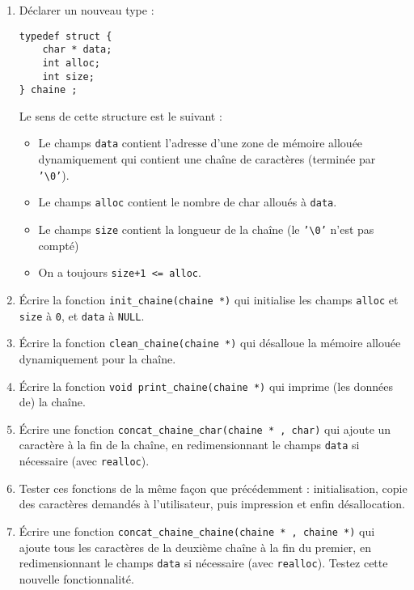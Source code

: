 \documentclass[final, pdftex, a4paper, openbib, ]{article}
\begin{document}
\begin{enumerate}
	\item Déclarer un nouveau type :
			\begin{verbatim}
typedef struct {
	char * data;
	int alloc;
	int size;
} chaine ;
			\end{verbatim}	

	Le sens de cette structure est le suivant :
	
	\begin{itemize}
		\item Le champs \texttt{data} contient l'adresse d'une zone de mémoire allouée dynamiquement qui
contient une chaîne de caractères (terminée par \texttt{'\textbackslash{}0'}).
		\item Le champs \texttt{alloc} contient le nombre de char alloués à \texttt{data}.
		\item Le champs \texttt{size} contient la longueur de la chaîne (le \texttt{'\textbackslash{}0'} n'est pas compté)
		\item On a toujours \texttt{size+1 <= alloc}.
	\end{itemize}

	\item Écrire la fonction \texttt{init\_chaine(chaine *)} qui initialise les champs \texttt{alloc} et \texttt{size} à \texttt{0}, et \texttt{data} à \texttt{NULL}.
	\item Écrire la fonction \texttt{clean\_chaine(chaine *)} qui désalloue la mémoire allouée dynamiquement pour la chaîne.
	\item Écrire la fonction \texttt{void print\_chaine(chaine *)} qui imprime (les données de) la chaîne.
	\item Écrire une fonction \texttt{concat\_chaine\_char(chaine * , char)} qui ajoute un caractère à la fin de la chaîne, en redimensionnant le champs \texttt{data} si nécessaire (avec \texttt{realloc}).
	\item Tester ces fonctions de la même façon que précédemment : initialisation, copie des caractères demandés à l'utilisateur, puis impression et enfin désallocation.
	\item Écrire une fonction \texttt{concat\_chaine\_chaine(chaine * , chaine *)} qui ajoute tous les caractères de la deuxième chaîne à la fin du premier, en redimensionnant le champs \texttt{data} si nécessaire (avec \texttt{realloc}).	Testez cette nouvelle fonctionnalité.
	
\end{enumerate}


\end{document}
